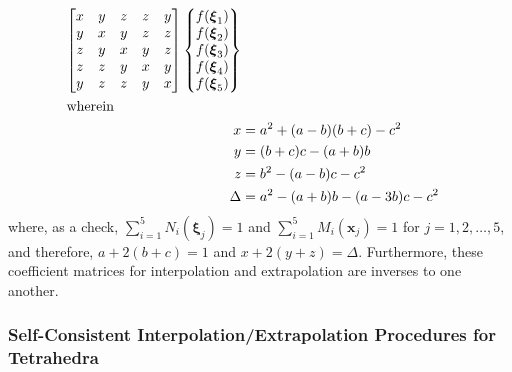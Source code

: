 \begin{subequations}
\begin{align}
\begin{bmatrix}
        x & y & z & z & y \\
        y & x & y & z & z \\
        z & y & x & y & z \\
        z & z & y & x & y \\
        y & z & z & y & x
        \end{bmatrix} \left\{ \begin{matrix}
        f ( \boldsymbol{\xi}_1 ) \\ 
        f ( \boldsymbol{\xi}_2 ) \\ 
        f ( \boldsymbol{\xi}_3 ) \\ 
        f ( \boldsymbol{\xi}_4 ) \\ 
        f ( \boldsymbol{\xi}_5 )
        \end{matrix} \right\}  \\
        \intertext{wherein}
        x & = a^2 + (a-b)(b+c) - c^2 \\
        y & = (b+c)c - (a+b)b \\
        z & = b^2 - (a-b)c - c^2 \\
        \Delta & = a^2 - (a+b)b - (a-3b)c - c^2
        \end{align}
    \end{subequations}
    where, as a check, $\sum_{i=1}^5 N_i (\boldsymbol{\xi}_j) = 1$ and $\sum_{i=1}^5 M_i (\boldsymbol{x}_j) = 1$ for $j=1,2,\ldots,5$, and therefore, $a + 2(b + c) = 1$ and $x + 2(y + z) = \Delta$.  Furthermore, these coefficient matrices for interpolation and extrapolation are inverses to one another.  
    
\subsubsection{Self-Consistent Interpolation\slash Extrapolation Procedures for Tetrahedra}
    
